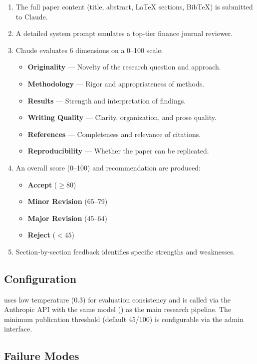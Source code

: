 \begin{enumerate}
  \item The full paper content (title, abstract, \LaTeX{} sections, BibTeX) is submitted to Claude.
  \item A detailed system prompt emulates a top-tier finance journal reviewer.
  \item Claude evaluates 6 dimensions on a 0--100 scale:
  \begin{itemize}
    \item \textbf{Originality} --- Novelty of the research question and approach.
    \item \textbf{Methodology} --- Rigor and appropriateness of methods.
    \item \textbf{Results} --- Strength and interpretation of findings.
    \item \textbf{Writing Quality} --- Clarity, organization, and prose quality.
    \item \textbf{References} --- Completeness and relevance of citations.
    \item \textbf{Reproducibility} --- Whether the paper can be replicated.
  \end{itemize}
  \item An overall score (0--100) and recommendation are produced:
  \begin{itemize}
    \item \textbf{Accept} ($\geq 80$)
    \item \textbf{Minor Revision} ($65$--$79$)
    \item \textbf{Major Revision} ($45$--$64$)
    \item \textbf{Reject} ($< 45$)
  \end{itemize}
  \item Section-by-section feedback identifies specific strengths and weaknesses.
\end{enumerate}

\subsection{Configuration}

\popper uses low temperature (0.3) for evaluation consistency and is called via the Anthropic API with the same model (\claude) as the main research pipeline.
The minimum publication threshold (default 45/100) is configurable via the admin interface.

\subsection{Failure Modes}

